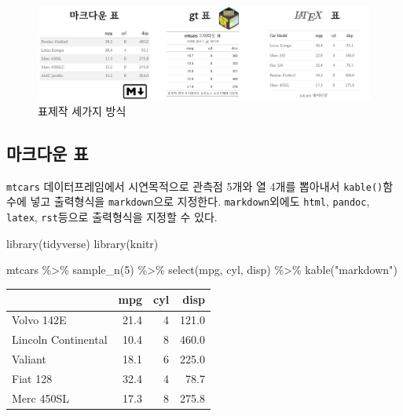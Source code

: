 \documentclass[
  letterpaper,
]{book}
\newenvironment{Shaded}{\begin{snugshade}}{\end{snugshade}}
\newcommand{\DecValTok}[1]{\textcolor[rgb]{0.68,0.00,0.00}{#1}}
\newcommand{\FunctionTok}[1]{\textcolor[rgb]{0.28,0.35,0.67}{#1}}
\newcommand{\NormalTok}[1]{\textcolor[rgb]{0.00,0.23,0.31}{#1}}
\newcommand{\SpecialCharTok}[1]{\textcolor[rgb]{0.37,0.37,0.37}{#1}}
\newcommand{\StringTok}[1]{\textcolor[rgb]{0.13,0.47,0.30}{#1}}
\begin{document}
\begin{figure}

{\centering \includegraphics{images/table_three.jpg}

}

\caption{표제작 세가지 방식}

\end{figure}

\hypertarget{rmarkdown-kable-table}{%
\subsection{마크다운 표}\label{rmarkdown-kable-table}}

\texttt{mtcars} 데이터프레임에서 시연목적으로 관측점 5개와 열 4개를
뽑아내서 \texttt{kable()}함수에 넣고 출력형식을 \texttt{markdown}으로
지정한다. \texttt{markdown}외에도 \texttt{html}, \texttt{pandoc},
\texttt{latex}, \texttt{rst}등으로 출력형식을 지정할 수 있다.

\begin{Shaded}
\begin{Highlighting}[]
\FunctionTok{library}\NormalTok{(tidyverse)}
\FunctionTok{library}\NormalTok{(knitr)}

\NormalTok{mtcars }\SpecialCharTok{\%\textgreater{}\%} 
  \FunctionTok{sample\_n}\NormalTok{(}\DecValTok{5}\NormalTok{) }\SpecialCharTok{\%\textgreater{}\%} 
  \FunctionTok{select}\NormalTok{(mpg, cyl, disp) }\SpecialCharTok{\%\textgreater{}\%} 
  \FunctionTok{kable}\NormalTok{(}\StringTok{"markdown"}\NormalTok{)}
\end{Highlighting}
\end{Shaded}

\begin{longtable}[]{@{}lrrr@{}}
\toprule\noalign{}
& mpg & cyl & disp \\
\midrule\noalign{}
\endhead
\bottomrule\noalign{}
\endlastfoot
Volvo 142E & 21.4 & 4 & 121.0 \\
Lincoln Continental & 10.4 & 8 & 460.0 \\
Valiant & 18.1 & 6 & 225.0 \\
Fiat 128 & 32.4 & 4 & 78.7 \\
Merc 450SL & 17.3 & 8 & 275.8 \\
\end{longtable}
\end{document}
